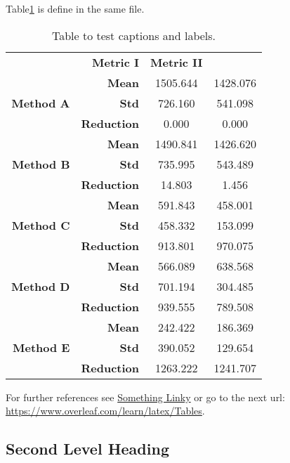 Table\ref{table:test2} is define in the same file. 


\begin{table}[h!]
\centering
\begin{tabular}{rrcc}
\addlinespace
\toprule
\multicolumn{ 2}{c}{{\bf Condition}} & {\bf Metric I} & {\bf Metric II} \\
\otoprule
{\bf } & {\bf Mean} & 1505.644 & 1428.076 \\
{\bf Method A} & {\bf Std} & 726.160 & 541.098 \\
{\bf } & {\bf Reduction} & 0.000 & 0.000 \\
\midrule
{\bf } & {\bf Mean} & 1490.841 & 1426.620 \\
{\bf Method B} & {\bf Std} & 735.995 & 543.489 \\
{\bf } & {\bf Reduction} & 14.803 & 1.456 \\
\midrule
{\bf } & {\bf Mean} & 591.843 & 458.001 \\
{\bf Method C} & {\bf Std} & 458.332 & 153.099 \\
{\bf } & {\bf Reduction} & 913.801 & 970.075 \\
\midrule
{\bf } & {\bf Mean} & 566.089 & 638.568 \\
{\bf Method D} & {\bf Std} & 701.194 & 304.485 \\
{\bf } & {\bf Reduction} & 939.555 & 789.508 \\
\midrule
{\bf } & {\bf Mean} & 242.422 & 186.369 \\
{\bf Method E} & {\bf Std} & 390.052 & 129.654 \\
      & {\bf Reduction} & 1263.222 & 1241.707 \\
\midrule
\end{tabular}
\caption{Table to test captions and labels.}
\label{table:test2}
\end{table}

For further references see \href{https://www.overleaf.com/learn/latex/Tables}{Something 
Linky} or go to the next url: \url{https://www.overleaf.com/learn/latex/Tables}.

\subsection{Second Level Heading}